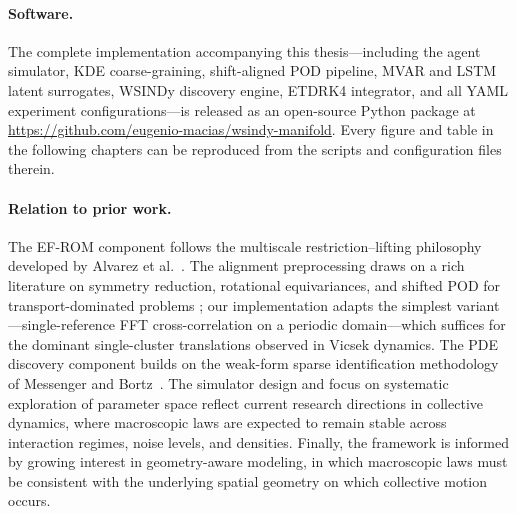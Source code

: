\documentclass{report}
\theoremstyle{plain}
\theoremstyle{remark}
\numberwithin{equation}{section}              %
\begin{document}
\paragraph{Software.}The complete implementation accompanying this thesis---including the agent simulator, KDE coarse-graining, shift-aligned POD pipeline, MVAR and LSTM latent surrogates, WSINDy discovery engine, ETDRK4 integrator, and all YAML experiment configurations---is released as an open-source Python package at \url{https://github.com/eugenio-macias/wsindy-manifold}. Every figure and table in the following chapters can be reproduced from the scripts and configuration files therein.

\paragraph{Relation to prior work.}The EF-ROM component follows the multiscale restriction--lifting philosophy developed by Alvarez et al.~\cite{alvarez2025eqfree}. The alignment preprocessing draws on a rich literature on symmetry reduction, rotational equivariances, and shifted POD for transport-dominated problems \cite{sonday2011alignment,budanur2015slices,reiss2018shifted_pod,black2020projection,siminos2015periodic,krah2024robust_spod}; our implementation adapts the simplest variant---single-reference FFT cross-correlation on a periodic domain---which suffices for the dominant single-cluster translations observed in Vicsek dynamics. The PDE discovery component builds on the weak-form sparse identification methodology of Messenger and Bortz~\cite{messenger2021wsindy}. The simulator design and focus on systematic exploration of parameter space reflect current research directions in collective dynamics, where macroscopic laws are expected to remain stable across interaction regimes, noise levels, and densities. Finally, the framework is informed by growing interest in geometry-aware modeling, in which macroscopic laws must be consistent with the underlying spatial geometry on which collective motion occurs.
\end{document}
